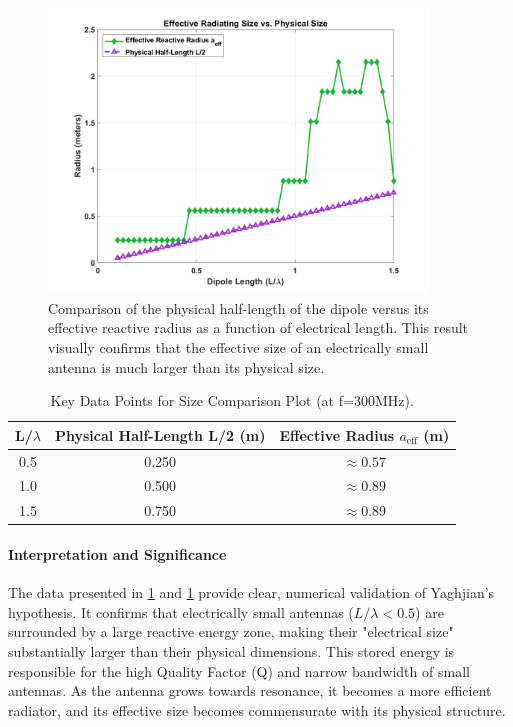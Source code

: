 \documentclass[11pt, a4paper]{report}
\begin{document}
\begin{figure}[H]
    \centering
    \includegraphics[width=0.9\textwidth]{Fig_Phase3_Size_Comparison.png}
    \caption{Comparison of the physical half-length of the dipole versus its effective reactive radius as a function of electrical length. This result visually confirms that the effective size of an electrically small antenna is much larger than its physical size.}
    \label{fig:size_comparison}
\end{figure}

\begin{table}[H]
\centering
\caption{Key Data Points for Size Comparison Plot (at f=300MHz).}
\label{tab:size_data}
\begin{tabular}{@{}ccc@{}}
\toprule
\textbf{L/$\lambda$} & \textbf{Physical Half-Length L/2 (m)} & \textbf{Effective Radius $a_{\text{eff}}$ (m)} \\ \midrule
0.5 & 0.250 & $\approx 0.57$ \\
1.0 & 0.500 & $\approx 0.89$ \\
1.5 & 0.750 & $\approx 0.89$ \\ \bottomrule
\end{tabular}
\end{table}

\paragraph{Interpretation and Significance}
The data presented in \cref{fig:size_comparison} and \cref{tab:size_data} provide clear, numerical validation of Yaghjian's hypothesis. It confirms that electrically small antennas ($L/\lambda < 0.5$) are surrounded by a large reactive energy zone, making their "electrical size" substantially larger than their physical dimensions. This stored energy is responsible for the high Quality Factor (Q) and narrow bandwidth of small antennas. As the antenna grows towards resonance, it becomes a more efficient radiator, and its effective size becomes commensurate with its physical structure.
\end{document}
